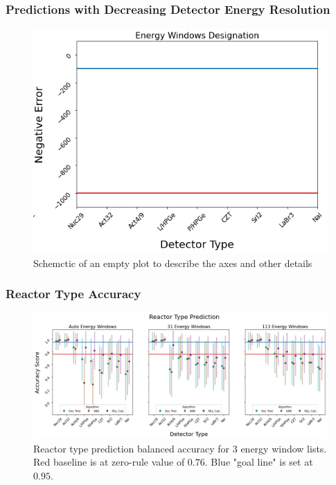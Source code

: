 \begin{frame}
  \frametitle{Predictions with Decreasing Detector Energy Resolution}
  \begin{figure}
    \centering
    \includegraphics[height=0.7\textheight]{./figures/plot_description.png}
    \caption{Schemctic of an empty plot to describe the axes and other details}
  \end{figure}
\end{frame}

\begin{frame}
  \frametitle{Reactor Type Accuracy}
  \begin{adjustwidth}{-25pt}{0pt}
  \begin{figure}
    \centering
    \includegraphics[width=1.15\textwidth]{./figures/detector_preds_wrt_enlist_reactor.png}
    \captionsetup{margin=0.6cm}
    \caption{Reactor type prediction balanced accuracy for 3 energy window lists. 
             Red baseline is at zero-rule value of $0.76$. Blue "goal line" is set at $0.95$.}
  \end{figure}
  \end{adjustwidth}
\end{frame}

